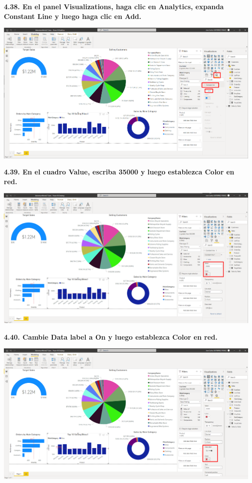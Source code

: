 \documentclass{article}
\begin{document}
\textbf{4.38. En el panel \textbf{Visualizations}, haga clic en \textbf{Analytics}, expanda \textbf{Constant Line} y luego haga clic en \textbf{Add}.}

    \begin{center}
		\includegraphics[width=14cm]{./images/114} 
	\end{center}

\newpage
\textbf{4.39. En el cuadro \textbf{Value}, escriba \textbf{35000} y luego establezca \textbf{Color} en \textbf{red}.}

    \begin{center}
		\includegraphics[width=14cm]{./images/115} 
	\end{center}


\textbf{4.40. Cambie \textbf{Data label} a \textbf{On} y luego establezca \textbf{Color} en \textbf{red}.}

    \begin{center}
		\includegraphics[width=14cm]{./images/116} 
	\end{center}
\end{document}
